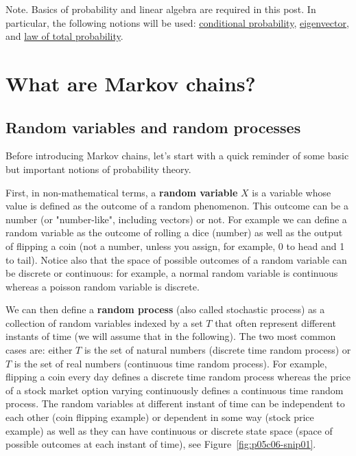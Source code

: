Note. Basics of probability and linear algebra are required in this post. In particular, the following notions will be used: 
\href{https://en.wikipedia.org/wiki/Conditional_probability}{conditional probability}, 
\href{https://en.wikipedia.org/wiki/Eigenvalues_and_eigenvectors}{eigenvector}, and 
\href{https://en.wikipedia.org/wiki/Law_of_total_probability}{law of total probability}.

\section{What are Markov chains?}
\subsection{Random variables and random processes}

Before introducing Markov chains, let's start with a quick reminder of some basic but important notions of probability theory.

First, in non-mathematical terms, a \textbf{random variable} $X$ is a variable whose value is defined as the outcome of a random phenomenon. This outcome can be a number (or "number-like", including vectors) or not. For example we can define a random variable as the outcome of rolling a dice (number) as well as the output of flipping a coin (not a number, unless you assign, for example, 0 to head and 1 to tail). Notice also that the space of possible outcomes of a random variable can be discrete or continuous: for example, a normal random variable is continuous whereas a poisson random variable is discrete.

We can then define a \textbf{random process} (also called stochastic process) as a collection of random variables indexed by a set $T$ that often represent different instants of time (we will assume that in the following). The two most common cases are: either $T$ is the set of natural numbers (discrete time random process) or $T$ is the set of real numbers (continuous time random process). For example, flipping a coin every day defines a discrete time random process whereas the price of a stock market option varying continuously defines a continuous time random process. The random variables at different instant of time can be independent to each other (coin flipping example) or dependent in some way (stock price example) as well as they can have continuous or discrete state space (space of possible outcomes at each instant of time), see Figure~\ref{fig:p05c06-snip01}.

